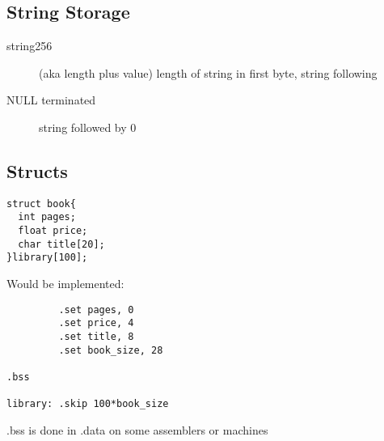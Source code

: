 \subsection{String Storage}

\begin{description}
  \item[string256] (aka length plus value) length of string in first byte, string following
  \item[NULL terminated] string followed by 0
\end{description}


\subsection{Structs}

\begin{verbatim}
struct book{
  int pages;
  float price;
  char title[20];
}library[100];
\end{verbatim}

Would be implemented:

\begin{verbatim}
         .set pages, 0
         .set price, 4
         .set title, 8
         .set book_size, 28

.bss

library: .skip 100*book_size
\end{verbatim}

.bss is done in .data on some assemblers or machines 